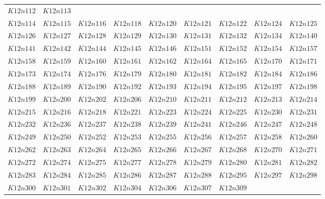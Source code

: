 \documentclass{amsart} %
\theoremstyle{thm}
\theoremstyle{definition}
\numberwithin{equation}{section}
\begin{document}
{\begin{longtable}{@{}lllllllll@{}}
  $K12n112$ &  
  $K12n113$ \\   
  $K12n114$ &  
  $K12n115$ &  
  $K12n116$ &  
  $K12n118$ &  
  $K12n120$ &  
  $K12n121$ &  
  $K12n122$ &  
  $K12n124$ &  
  $K12n125$ \\   
  $K12n126$ &  
  $K12n127$ &  
  $K12n128$ &  
  $K12n129$ &  
  $K12n130$ &  
  $K12n131$ &  
  $K12n132$ &  
  $K12n134$ &  
  $K12n140$ \\   
  $K12n141$ &  
  $K12n142$ &  
  $K12n144$ &  
  $K12n145$ &  
  $K12n146$ &  
  $K12n151$ &  
  $K12n152$ &  
  $K12n154$ &  
  $K12n157$ \\   
  $K12n158$ &  
  $K12n159$ &  
  $K12n160$ &  
  $K12n161$ &  
  $K12n162$ &  
  $K12n164$ &  
  $K12n165$ &  
  $K12n170$ &  
  $K12n171$ \\   
  $K12n173$ &  
  $K12n174$ &  
  $K12n176$ &  
  $K12n179$ &  
  $K12n180$ &  
  $K12n181$ &  
  $K12n182$ &  
  $K12n184$ &  
  $K12n186$ \\   
  $K12n188$ &  
  $K12n189$ &  
  $K12n190$ &  
  $K12n192$ &  
  $K12n193$ &  
  $K12n194$ &  
  $K12n195$ &  
  $K12n197$ &  
  $K12n198$ \\   
  $K12n199$ &  
  $K12n200$ &  
  $K12n202$ &  
  $K12n206$ &  
  $K12n210$ &  
  $K12n211$ &  
  $K12n212$ &  
  $K12n213$ &  
  $K12n214$ \\  
  $K12n215$ &  
  $K12n216$ &  
  $K12n218$ &  
  $K12n221$ &  
  $K12n223$ &  
  $K12n224$ &  
  $K12n225$ &  
  $K12n230$ &  
  $K12n231$ \\   
  $K12n232$ &  
  $K12n236$ &  
  $K12n237$ &  
  $K12n238$ &  
  $K12n239$ &  
  $K12n241$ &  
  $K12n246$ &  
  $K12n247$ &  
  $K12n248$ \\   
  $K12n249$ &  
  $K12n250$ &  
  $K12n252$ &  
  $K12n253$ &  
  $K12n255$ &  
  $K12n256$ &  
  $K12n257$ &  
  $K12n258$ &  
  $K12n260$ \\   
  $K12n262$ &  
  $K12n263$ &  
  $K12n264$ &  
  $K12n265$ &  
  $K12n266$ &  
  $K12n267$ &  
  $K12n268$ &  
  $K12n270$ &  
  $K12n271$ \\   
  $K12n272$ &  
  $K12n274$ &  
  $K12n275$ &  
  $K12n277$ &  
  $K12n278$ &  
  $K12n279$ &  
  $K12n280$ &  
  $K12n281$ &  
  $K12n282$ \\   
  $K12n283$ &  
  $K12n284$ &  
  $K12n285$ &  
  $K12n286$ &  
  $K12n287$ &  
  $K12n288$ &  
  $K12n295$ &  
  $K12n297$ &  
  $K12n298$ \\   
  $K12n300$ &  
  $K12n301$ &  
  $K12n302$ &  
  $K12n304$ &  
  $K12n306$ &  
  $K12n307$ &  
  $K12n309$ &  

\end{longtable}}
\end{document}
